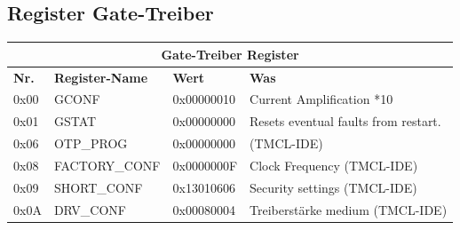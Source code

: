 \subsection{Register Gate-Treiber}\label{Appendix:TMC6200_Register}

\begin{table}[H]
\centering
\begin{tabular}{|l|l|l|l|}
\hline
\multicolumn{4}{|c|}{\textbf{Gate-Treiber Register}}          \\ \hline
\textbf{Nr.} & \textbf{Register-Name} & \textbf{Wert}       & \textbf{Was} \\ \hline
0x00         & GCONF         & 0x00000010 & Current Amplification *10    \\ \hline
0x01         & GSTAT         & 0x00000000 & Resets eventual faults from restart.    \\ \hline
0x06         & OTP\_PROG     & 0x00000000 & (TMCL-IDE)    \\ \hline
0x08         & FACTORY\_CONF & 0x0000000F & Clock Frequency (TMCL-IDE)    \\ \hline
0x09         & SHORT\_CONF   & 0x13010606 & Security settings (TMCL-IDE)    \\ \hline
0x0A         & DRV\_CONF     & 0x00080004 & Treiberstärke medium (TMCL-IDE)    \\ \hline
\end{tabular}
\end{table}
